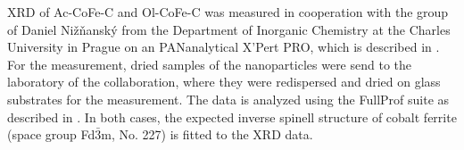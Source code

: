 \documentclass[\main/dresen_thesis.tex]{subfiles}
\begin{document}
    XRD of Ac-CoFe-C and Ol-CoFe-C was measured in cooperation with the group of Daniel Nižňanský from the Department of Inorganic Chemistry at the Charles University in Prague on an PANanalytical X'Pert PRO, which is described in .
    For the measurement, dried samples of the nanoparticles were send to the laboratory of the collaboration, where they were redispersed and dried on glass substrates for the measurement.
    The data is analyzed using the FullProf suite \cite{Rodriguez_1993_Recen} as described in .
    In both cases, the expected inverse spinell structure of cobalt ferrite (space group Fd$\bar{3}$m, No. 227) is fitted to the XRD data.
\end{document}
